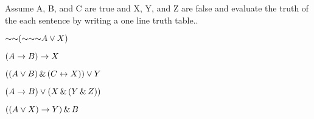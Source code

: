\noindent\problempart
Assume A, B, and C are true and X, Y, and Z are false and evaluate the truth of the each sentence by writing a one line truth table.. 


\begin{earg}
\item $\mathord{\sim}  \mathord{\sim}  (\mathord{\sim}  \mathord{\sim}  \mathord{\sim} A  \vee  X) $


\item $(A \rightarrow B) \rightarrow X$	


\item $((A \vee B) \,\&\, (C \leftrightarrow X)) \vee Y$	


\item $(A \rightarrow 	B)	\vee 	(X 	\,\&\, 	(Y 	\,\&\, 	Z))$	


\item $((A  	\vee 	X) \rightarrow Y) 	\,\&\, B $


\end{earg}

